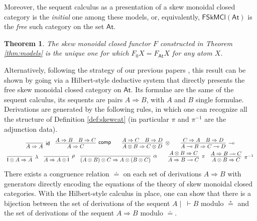 \documentclass[copyright,creativecommons]{eptcs}
\newtheorem{theorem}{Theorem}[section]
\theoremstyle{definition}
\newcommand{\id}{\mathsf{id}}
\newcommand{\ot}{\otimes}
\newcommand{\lolli}{\multimap}
\newcommand{\I}{\mathsf{I}}
\newcommand{\FSkMCC}{\mathsf{FSkMCl}}
\begin{document}
Moreover, the sequent calculus as a presentation of a skew monoidal closed category is the \emph{initial} one among these
models, or, equivalently, $\FSkMCC(\mathsf{At})$ is the \emph{free}
such category on the set $\mathsf{At}$.

\begin{theorem}\label{thm:unique}
  The skew monoidal closed functor $F$ constructed in Theorem \ref{thm:models} 
  is the unique one for which $F_0 X = F_{\mathsf{At}} X$ for any atom $X$.
\end{theorem}

Alternatively, following the strategy of our previous papers \cite{uustalu:sequent:2021,uustalu:proof:nodate,uustalu:deductive:nodate,veltri:coherence:2021}, this result can be shown by going via a Hilbert-style deductive system that directly presents the free skew monoidal closed category on $\mathsf{At}$. Its formulae are the same of the sequent calculus, its sequents are pairs $A \Rightarrow B$, with $A$ and $B$ single formulae. Derivations are generated by the following rules, in which one can  recognize all the structure of Definition \ref{def:skewcat} (in particular $\pi$ and $\pi^{-1}$ are the adjunction data).
\begin{displaymath}
  \def\arraystretch{1.5}
  \begin{array}{c}
        \infer[\id]{A \Rightarrow A}{}
        \quad
        \infer[\mathsf{comp}]{A \Rightarrow C}{
          A \Rightarrow B
          &
          B \Rightarrow C
        }
        \qquad
      \infer[\otimes]{A \ot B \Rightarrow C \ot D}{
        A \Rightarrow C
        &
        B \Rightarrow D
      }
      \qquad
      \infer[\lolli]{A \lolli B \Rightarrow C \lolli D}{
        C \Rightarrow A
        &
        B \Rightarrow D
      }
      \\
      \infer[\lambda]{\I \ot A \Rightarrow A}{}
      \quad
      \infer[\rho]{A \Rightarrow A \ot \I}{}
      \quad
      \infer[\alpha]{(A \ot B) \ot C \Rightarrow A \ot (B \ot C)}{}
      \qquad
      \infer[\pi]{A \Rightarrow B \lolli C}{A \ot B \Rightarrow C}
      \quad
      \infer[\pi^{-1}]{A \ot B \Rightarrow C}{A \Rightarrow B \lolli C}
  \end{array}
\end{displaymath}
There exists a congruence relation $\doteq$ on each set of derivations $A \Rightarrow B$ with generators directly encoding the equations of the theory of skew monoidal closed categories. With the Hilbert-style calculus in place, one can show that there is a bijection between the set of derivations of the sequent $A \mid ~ \vdash B$ modulo $\circeq$ and the set of derivations of the sequent $A \Rightarrow B$ modulo $\doteq$.
\end{document}

